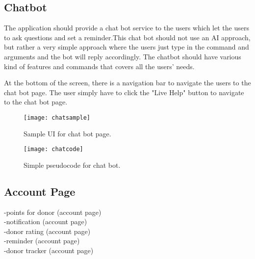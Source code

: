 \documentclass[conference]{IEEEtran}
\begin{document}
\subsection{Chatbot}
The  application  should  provide  a  chat  bot  service  to  the users which let the users to ask questions and set a reminder.This chat bot should not use an AI approach, but rather a very simple  approach  where  the  users  just  type  in  the  command and  arguments  and  the  bot  will  reply  accordingly.  The  chatbot  should  have  various  kind  of  features  and  commands  that covers all the users’ needs. 
\\\par  At the bottom of the screen, there is a navigation bar to navigate the users to the chat bot page. The user simply have to click the "Live Help" button to navigate to the chat bot page.

\begin{figure}[h!]
\texttt{[image: chatsample]}
\centering
\caption{Sample UI for chat bot page.}
\end{figure}

\begin{figure}[h!]
\texttt{[image: chatcode]}
\centering
\caption{Simple pseudocode for chat bot.}
\end{figure}

\subsection{Account Page}
-points for donor (account page)\\
-notification (account page)\\
-donor rating (account page)\\
-reminder (account page)\\
-donor tracker (account page)\\
\end{document}
